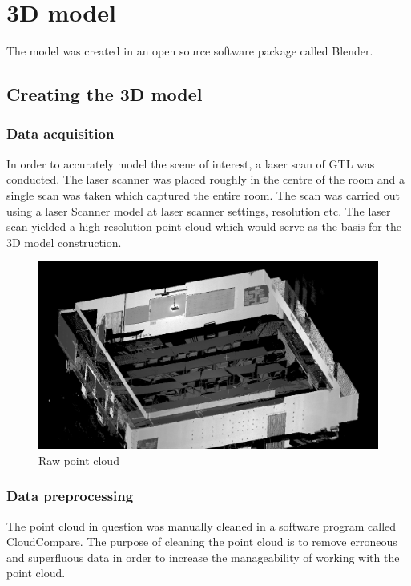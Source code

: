 \documentclass[11pt,a4paper]{report}
\begin{document}
		
	\section{3D model}
		The model was created in an open source software package called Blender.
		
		\subsection{Creating the 3D model}
			\subsubsection{Data acquisition}
				In order to accurately model the scene of interest, a laser scan of GTL was conducted. The laser scanner was placed roughly in the centre of the room and a single scan was taken which captured the entire room. The scan was carried out using a {{laser Scanner model}} at {{laser scanner settings, resolution etc}}. The laser scan yielded a high resolution point cloud which would serve as the basis for the 3D model construction.
				
				\begin{figure}[H]
					\centering
					\includegraphics[width=1\textwidth]{raw_point_cloud_1}
					\caption{Raw point cloud}
				\end{figure}
				
			\subsubsection{Data preprocessing}
				The point cloud in question was manually cleaned in a software program called CloudCompare. The purpose of cleaning the point cloud is to remove erroneous and superfluous data in order to increase the manageability of working with the point cloud.
	
\end{document}
